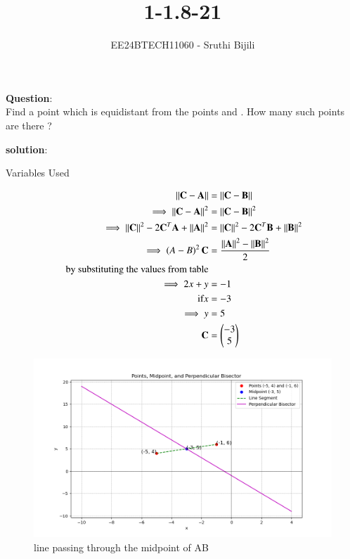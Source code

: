 \documentclass[journal]{IEEEtran}
\begin{document}

\vspace{3cm}

\title{1-1.8-21}
\author{EE24BTECH11060 - Sruthi Bijili}
{\let\newpage\relax\maketitle}

\renewcommand{\thefigure}{\theenumi}
\renewcommand{\thetable}{\theenumi}
\setlength{\intextsep}{10pt} %


\renewcommand{\thetable}{\theenumi}

\textbf{Question}:\\
Find a point which is equidistant from the points  and . How many such points are there ?

\textbf{solution}:\\
\begin{table}[h!]    
  \centering
  
  \caption{Variables Used}
  \label{tab1.1.8.21}
\end{table}
\begin{align}
\left\vert\left\vert\mathbf{C}-\mathbf{A}\right\vert\right\vert&=\left\vert\left\vert\mathbf{C}-\mathbf{B}\right\vert\right\vert\\
\implies\left\vert\left\vert\mathbf{C}-\mathbf{A}\right\vert\right\vert^2&=\left\vert\left\vert\mathbf{C}-\mathbf{B}\right\vert\right\vert^2\\
\implies\left\vert\left\vert\mathbf{C}\right\vert\right\vert^2-2\mathbf{C}^T\mathbf{A}+\left\vert\left\vert\mathbf{A}\right\vert\right\vert^2&=\left\vert\left\vert\mathbf{C}\right\vert\right\vert^2-2\mathbf{C}^T\mathbf{B}+\left\vert\left\vert\mathbf{B}\right\vert\right\vert^2\\
\implies\left(A-B\right)^2\mathbf{C}&=\frac{\left\vert\left\vert\mathbf{A}\right\vert\right\vert^2-\left\vert\left\vert\mathbf{B}\right\vert\right\vert^2}{2}\\
\text{ by substituting the values from table}\\
\implies 2x+y&=-1\\
\text{if} x&=-3\\
\implies y&=5\\
\mathbf{C}&=\begin{pmatrix}-3 \\ 5\end{pmatrix}
\end{align}
\begin{figure}[h!]
   \centering
   \includegraphics[width=0.7\linewidth]{figs/fig1.png}
   \caption{line passing through the midpoint of AB}
\end{figure}
\end{document}
